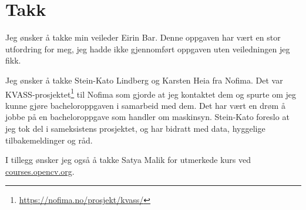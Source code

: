 \section*{Takk}

Jeg ønsker å takke min veileder Eirin Bar. Denne oppgaven har vært en stor utfordring for meg, jeg hadde ikke gjennomført oppgaven uten veiledningen jeg fikk. 

Jeg ønsker å takke Stein-Kato Lindberg og Karsten Heia fra Nofima. Det var KVASS-prosjektet\footnote{\url{https://nofima.no/prosjekt/kvass/}} til Nofima som gjorde at jeg kontaktet dem og spurte om jeg kunne gjøre bacheloroppgaven i samarbeid med dem. Det har vært en drøm å jobbe på en bacheloroppgave som handler om maskinsyn. Stein-Kato foreslo at jeg tok del i sameksistens prosjektet, og har bidratt med data, hyggelige tilbakemeldinger og råd.

I tillegg ønsker jeg også å takke Satya Malik for utmerkede kurs ved \url{courses.opencv.org}.


